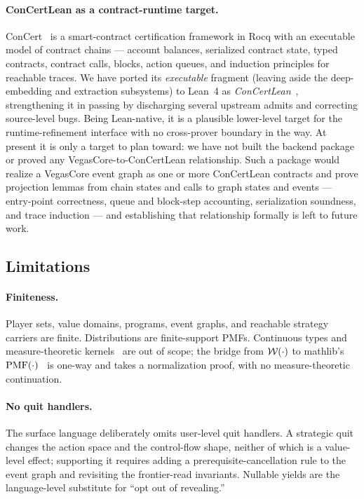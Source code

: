 \paragraph{ConCertLean as a contract-runtime target.}
ConCert~\citep{Annenkov2020ConCert} is a smart-contract certification
framework in Rocq with an executable model of contract chains --- account
balances, serialized contract state, typed contracts, contract calls, blocks,
action queues, and induction principles for reachable traces.  We have ported
its \emph{executable} fragment (leaving aside the deep-embedding and extraction
subsystems) to Lean~4 as \emph{ConCertLean}~\citep{GershuniConCertLean},
strengthening it in passing by discharging several upstream admits and
correcting source-level bugs.  Being Lean-native, it is a plausible lower-level
target for the runtime-refinement interface with no cross-prover boundary in
the way.  At present it is only a target to plan toward: we have not built the
backend package or proved any VegasCore-to-ConCertLean relationship.  Such a
package would realize a VegasCore event graph as one or more ConCertLean
contracts and prove projection lemmas from chain states and calls to graph
states and events --- entry-point correctness, queue and block-step accounting,
serialization soundness, and trace induction --- and establishing that
relationship formally is left to future work.

\subsection{Limitations}
\label{sec:disc:limits}

\paragraph{Finiteness.}  Player sets, value domains, programs, event
graphs, and reachable strategy carriers are finite.  Distributions
are finite-support PMFs.  Continuous types and measure-theoretic
kernels~\citep{Giry1982,Kozen1981} are out of scope; the bridge
from $\mathcal{W}(\cdot)$ to mathlib's $\mathrm{PMF}(\cdot)$~\citep{mathlib2020}
is one-way and takes a normalization proof, with no measure-theoretic
continuation.

\paragraph{No quit handlers.}  The surface language deliberately
omits user-level quit handlers.  A strategic quit changes the
action space and the control-flow shape, neither of which is a
value-level effect; supporting it requires adding a
prerequisite-cancellation rule to the event graph and revisiting
the frontier-read invariants.  Nullable yields are the language-level
substitute for ``opt out of revealing.''

